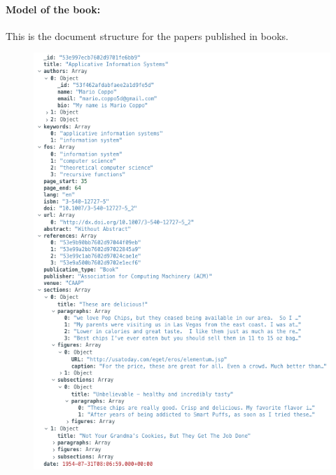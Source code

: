 \paragraph{Model of the book:}
This is the document structure for the papers published in books.
\begin{figure}[H]
    \begin{center}
        \includegraphics[width=0.6\linewidth]{ImagesMongoDB/book}
        \label{fig:book}%
    \end{center}
\end{figure}

